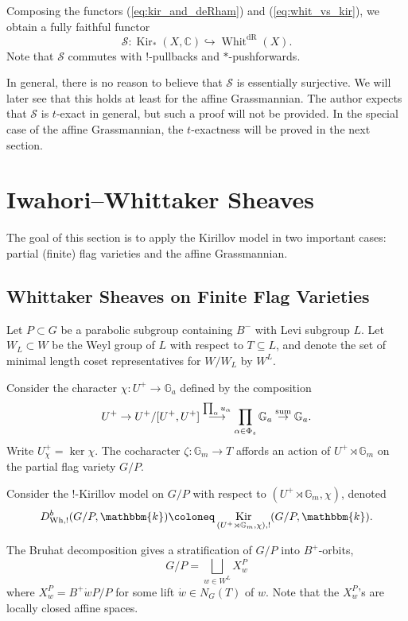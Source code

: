\documentclass{amsart}
\newcommand{\C}{\mathbb{C}}
\newcommand{\G}{\mathbb{G}}
\renewcommand{\k}{\mathbbm{k}}
\DeclareMathOperator{\dR}{dR}
\DeclareMathOperator{\Wh}{Wh}
\DeclareMathOperator{\Kir}{Kir}
\DeclareMathOperator{\Whit}{Whit}
\theoremstyle{definition}
\begin{document}
    Composing the functors (\ref{eq:kir_and_deRham}) and (\ref{eq:whit_vs_kir}), we obtain a fully faithful functor
    \begin{equation*}
        \mathcal{S} : \Kir_* (X, \C) \hookrightarrow \Whit^{\dR} (X).
    \end{equation*}
    Note that $\mathcal{S}$ commutes with $!$-pullbacks and $*$-pushforwards.

    In general, there is no reason to believe that $\mathcal{S}$ is essentially surjective. We will later see that this holds at least for the affine Grassmannian.
    The author expects that $\mathcal{S}$ is $t$-exact in general, but such a proof will not be provided. In the special case of the affine Grassmannian, the $t$-exactness will be proved in the next section.

    \section{Iwahori--Whittaker Sheaves}
    
    The goal of this section is to apply the Kirillov model in two important cases: partial (finite) flag varieties and the affine Grassmannian.

    \subsection{Whittaker Sheaves on Finite Flag Varieties}

    Let $P \subset G$ be a parabolic subgroup containing $B^{-}$ with Levi subgroup $L$.
    Let $W_L \subset W$ be the Weyl group of $L$ with respect to $T \subseteq L$, and denote the set of minimal length coset representatives for $W/W_L$ by $W^L$.

    Consider the character $\chi : U^+ \to \G_a$ defined by the composition
    \[U^+ \to U^+ / [U^+, U^+] \stackrel{\prod_{\alpha} u_{\alpha}}{\longrightarrow} \prod_{\alpha \in \Phi_s} \G_a \stackrel{\textnormal{sum}}{\to} \G_a.\]
    Write $U_{\chi}^+ = \ker \chi$. The cocharacter $\zeta : \G_m \to T$ affords an action of $U^+ \rtimes \G_m$ on the partial flag variety $G/P$. 

    Consider the $!$-Kirillov model on $G/P$ with respect to $(U^+ \rtimes \G_m, \chi)$, denoted
    \[D_{\Wh, !}^b (G/P, \k) \coloneq \Kir_{(U^+ \rtimes \G_m, \chi), !} (G/P, \k).\]

    The Bruhat decomposition gives a stratification of $G/P$ into $B^{+}$-orbits,
    \[G/P = \bigsqcup_{w \in W^L} X_w^P\]
    where $X_w^P = B^{+} \dot{w} P/P$ for some lift $\dot{w} \in N_G (T)$ of $w$. 
    Note that the $X_w^P$'s are locally closed affine spaces.
\end{document}
